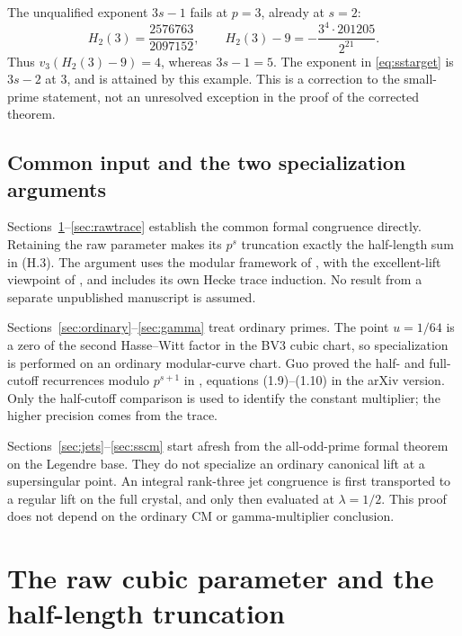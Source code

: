 \documentclass[11pt,a4paper]{article}
\begin{document}
The unqualified exponent $3s-1$ fails at $p=3$, already at $s=2$:
\[
 H_2(3)=\frac{2576763}{2097152},\qquad
 H_2(3)-9=-\frac{3^4\cdot201205}{2^{21}}.
\]
Thus $v_3(H_2(3)-9)=4$, whereas $3s-1=5$. The exponent in
\eqref{eq:sstarget} is $3s-2$ at $3$, and is attained by this example.
This is a correction to the small-prime statement, not an unresolved
exception in the proof of the corrected theorem.

\subsection{Common input and the two specialization arguments}

Sections~\ref{sec:rawparameter}--\ref{sec:rawtrace} establish the common
formal congruence directly. Retaining the raw parameter makes its
$p^s$ truncation exactly the half-length sum in (H.3). The argument
uses the modular framework of \cite{Beukers,Katz}, with the
excellent-lift viewpoint of \cite{BV3}, and includes its own Hecke
trace induction. No result from a separate unpublished manuscript is
assumed.

Sections~\ref{sec:ordinary}--\ref{sec:gamma} treat ordinary primes.
The point $u=1/64$ is a zero of the second Hasse--Witt factor in the
BV3 cubic chart, so specialization is performed on an ordinary
modular-curve chart. Guo proved the half- and full-cutoff recurrences
modulo $p^{s+1}$ in \cite{Guo}, equations (1.9)--(1.10) in the arXiv
version. Only the half-cutoff comparison is used to identify the
constant multiplier; the higher precision comes from the trace.

Sections~\ref{sec:jets}--\ref{sec:sscm} start afresh from the all-odd-prime
formal theorem on the Legendre base. They do not specialize an ordinary
canonical lift at a supersingular point. An integral rank-three jet
congruence is first transported to a regular lift on the full crystal,
and only then evaluated at $\lambda=1/2$. This proof does not depend
on the ordinary CM or gamma-multiplier conclusion.

\section{The raw cubic parameter and the half-length truncation}\label{sec:rawparameter}
\end{document}
